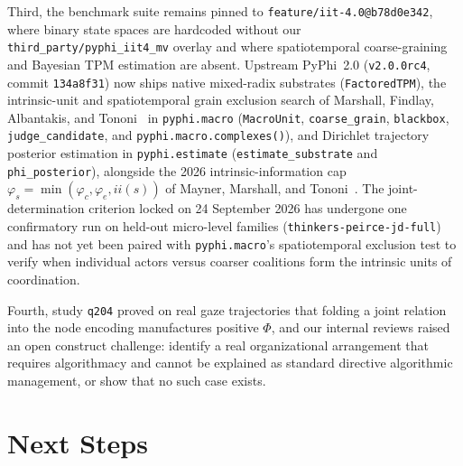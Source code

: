 \documentclass[11pt,a4paper]{article}
\begin{document}
Third, the benchmark suite remains pinned to \texttt{feature/iit-4.0@b78d0e342}, where binary state spaces are hardcoded without our \texttt{third\_party/pyphi\_iit4\_mv} overlay and where spatiotemporal coarse-graining and Bayesian TPM estimation are absent. Upstream PyPhi~2.0 (\texttt{v2.0.0rc4}, commit \texttt{134a8f31}) now ships native mixed-radix substrates (\texttt{FactoredTPM}), the intrinsic-unit and spatiotemporal grain exclusion search of Marshall, Findlay, Albantakis, and Tononi~\cite{marshall2026intrinsic} in \texttt{pyphi.macro} (\texttt{MacroUnit}, \texttt{coarse\_grain}, \texttt{blackbox}, \texttt{judge\_candidate}, and \texttt{pyphi.macro.complexes()}), and Dirichlet trajectory posterior estimation in \texttt{pyphi.estimate} (\texttt{estimate\_substrate} and \texttt{phi\_posterior}), alongside the 2026 intrinsic-information cap $\varphi_s = \min(\varphi_c, \varphi_e, \mathit{ii}(s))$ of Mayner, Marshall, and Tononi~\cite{mayner2026intrinsic}. The joint-determination criterion locked on 24 September 2026 has undergone one confirmatory run on held-out micro-level families (\texttt{thinkers-peirce-jd-full}) and has not yet been paired with \texttt{pyphi.macro}'s spatiotemporal exclusion test to verify when individual actors versus coarser coalitions form the intrinsic units of coordination.

Fourth, study \texttt{q204} proved on real gaze trajectories that folding a joint relation into the node encoding manufactures positive $\Phi$, and our internal reviews raised an open construct challenge: identify a real organizational arrangement that requires algorithmacy and cannot be explained as standard directive algorithmic management, or show that no such case exists.

\section{Next Steps}
\end{document}
